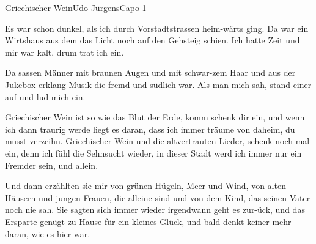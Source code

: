 \begin{song}{Griechischer Wein}{Udo Jürgens}{Capo 1}


Es war schon dunkel, als ich durch Vorstadtstrassen heim-wärts ging.
Da war ein Wirtshaus aus dem das Licht noch auf den Gehsteig schien.
      Ich hatte Zeit und mir war kalt, drum trat ich ein.

Da sassen Männer mit braunen Augen und mit schwar-zem Haar
und aus der Jukebox erklang Musik die fremd und südlich war.
      Als man mich sah, stand einer auf und lud mich ein.

Griechischer Wein ist so wie das Blut der Erde, komm schenk dir ein,
und wenn ich dann traurig werde liegt es daran,
dass ich immer träume von daheim, du musst verzeihn.
Griechischer Wein und die altvertrauten Lieder, schenk noch mal ein,
denn ich fühl die Sehnsucht wieder, in dieser Stadt
werd ich immer nur ein Fremder sein,     und allein.

Und dann erzählten sie mir von grünen Hügeln, Meer und Wind,
von alten Häusern und jungen Frauen, die alleine sind
      und von dem Kind, das seinen Vater noch nie sah. 
Sie sagten sich immer wieder irgendwann geht es zur-ück,
und das Ersparte genügt zu Hause für ein kleines Glück,
      und bald denkt keiner mehr daran, wie es hier war.

\end{song}
